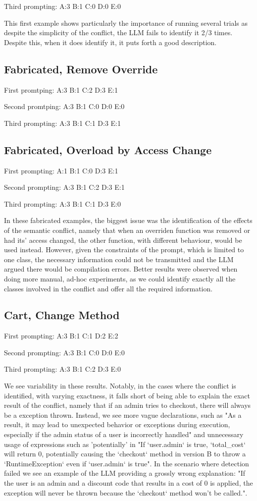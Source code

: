 Third prompting:
A:3
B:1
C:0
D:0
E:0

This first example shows particularly the importance of running several trials as despite the simplicity of the conflict, the LLM fails to identify it 2/3 times. Despite this, when it does identify it, it puts forth a good description.

\subsection{Fabricated, Remove Override}

First promtping:
A:3
B:1
C:2
D:3
E:1


Second promtping:
A:3
B:1
C:0
D:0
E:0


Third prompting:
A:3
B:1
C:1
D:3
E:1

\subsection{Fabricated, Overload by Access Change}
First prompting:
A:1
B:1
C:0
D:3
E:1

Second prompting:
A:3
B:1
C:2
D:3
E:1

Third prompting:
A:3
B:1
C:1
D:3
E:0

In these fabricated examples, the biggest issue was the identification of the effects of the semantic conflict, namely that when an overriden function was removed or had its' access changed, the other function, with different behaviour, would be used instead. However, given the constraints of the prompt, which is limited to one class, the necessary information could not be transmitted and the LLM argued there would be compilation errors. Better results were observed when doing more manual, ad-hoc experiments, as we could identify exactly all the classes involved in the conflict and offer all the required information.

\subsection{Cart, Change Method}

First prompting:
A:3
B:1
C:1
D:2
E:2

Second prompting:
A:3
B:1
C:0
D:0
E:0

Third prompting:
A:3
B:1
C:2
D:3
E:0

We see variability in these results. Notably, in the cases where the conflict is identified, with varying exactness, it falls short of being able to explain the exact result of the conflict, namely that if an admin tries to checkout, there will always be a exception thrown. Instead, we see more vague declarations, such as "As a result, it may lead to unexpected behavior or exceptions during execution, especially if the admin status of a user is incorrectly handled" and unnecessary usage of expressions such as 'potentially' in "If `user.admin` is true, `total\_cost` will return 0, potentially causing the `checkout` method in version B to throw a `RuntimeException` even if `user.admin` is true".
In the scenario where detection failed we see an example of the LLM providing a grossly wrong explanation: "If the user is an admin and a discount code that results in a cost of 0 is applied, the exception will never be thrown because the `checkout` method won't be called.".
